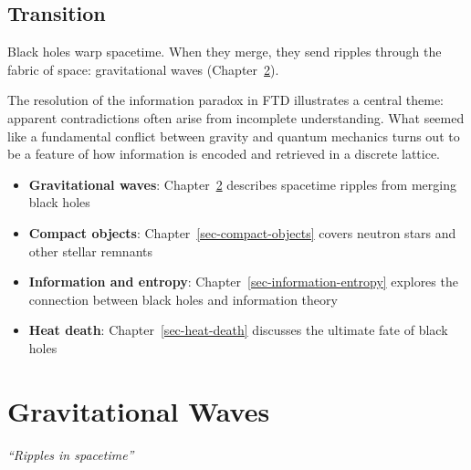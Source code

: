 \documentclass[
  11pt,
  letterpaper,
  twoside,
  openright]{book}
\providecommand{\tightlist}{%
  \setlength{\itemsep}{0pt}\setlength{\parskip}{0pt}}
\begin{document}
\section{Transition}\label{transition-33}

Black holes warp spacetime. When they merge, they send ripples through
the fabric of space: gravitational waves
(Chapter~\ref{sec-gravitational-waves}).

The resolution of the information paradox in FTD illustrates a central
theme: apparent contradictions often arise from incomplete
understanding. What seemed like a fundamental conflict between gravity
and quantum mechanics turns out to be a feature of how information is
encoded and retrieved in a discrete lattice.

\begin{tcolorbox}[enhanced jigsaw, coltitle=black, colbacktitle=quarto-callout-tip-color!10!white, toprule=.15mm, colframe=quarto-callout-tip-color-frame, arc=.35mm, opacityback=0, bottomtitle=1mm, toptitle=1mm, breakable, colback=white, titlerule=0mm, opacitybacktitle=0.6, title=\textcolor{quarto-callout-tip-color}{\faLightbulb}\hspace{0.5em}{Related Topics}, rightrule=.15mm, bottomrule=.15mm, leftrule=.75mm, left=2mm]

\begin{itemize}
\tightlist
\item
  \textbf{Gravitational waves}: Chapter~\ref{sec-gravitational-waves}
  describes spacetime ripples from merging black holes
\item
  \textbf{Compact objects}: Chapter~\ref{sec-compact-objects} covers
  neutron stars and other stellar remnants
\item
  \textbf{Information and entropy}:
  Chapter~\ref{sec-information-entropy} explores the connection between
  black holes and information theory
\item
  \textbf{Heat death}: Chapter~\ref{sec-heat-death} discusses the
  ultimate fate of black holes
\end{itemize}

\end{tcolorbox}

\chapter{Gravitational Waves}\label{sec-gravitational-waves}

\emph{``Ripples in spacetime''}
\end{document}
